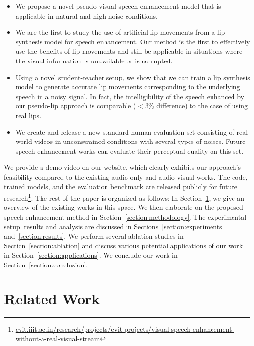 \documentclass[10pt,twocolumn,letterpaper]{article}
\begin{document}
\begin{itemize}[nosep]
     \item We propose a novel pseudo-visual speech enhancement model that is applicable in natural and high noise conditions.  
     
     \item We are the first to study the use of artificial lip movements from a lip synthesis model for speech enhancement. Our method is the first to effectively use the benefits of lip movements and still be applicable in situations where the visual information is unavailable or is corrupted.
     
     \item Using a novel student-teacher setup, we show that we can train a lip synthesis model to generate accurate lip movements corresponding to the underlying speech in a noisy signal. In fact, the intelligibility of the speech enhanced by our pseudo-lip approach is comparable ($< 3\%$ difference) to the case of using real lips.
     
     \item We create and release a new standard human evaluation set consisting of real-world videos in unconstrained conditions with several types of noises. Future speech enhancement works can evaluate their perceptual quality on this set. 
     
\end{itemize}

We provide a demo video on our website, which clearly exhibits our approach's feasibility compared to the existing audio-only and audio-visual works. The code, trained models, and the evaluation benchmark are released publicly for future research\footnote{\scriptsize\url{cvit.iiit.ac.in/research/projects/cvit-projects/visual-speech-enhancement-without-a-real-visual-stream}}. The rest of the paper is organized as follows: In Section~\ref{section:related}, we give an overview of the existing works in this space. We then elaborate on the proposed speech enhancement method in Section~\ref{section:methodology}. The experimental setup, results and analysis are discussed in Sections~\ref{section:experiments} and~\ref{section:results}. We perform several ablation studies in Section~\ref{section:ablation} and discuss various potential applications of our work in Section~\ref{section:applications}. We conclude our work in Section~\ref{section:conclusion}. 

\section{Related Work}
\label{section:related}
\end{document}
